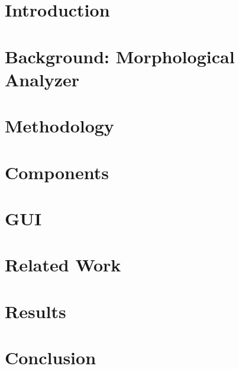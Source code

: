

\section{Introduction}
\label{sec:introduction}


\section{Background: Morphological Analyzer}
\label{sec:morph}


\vspace{-1em}
\section{\framework Methodology}
\vspace{-.5em}
\label{sec:methodology}


\vspace{-1em}
\section{\framework Components}
\label{sec:framework}
\label{sec:tool}


\section{\framework GUI}
\label{sec:gui}


\section{Related Work}
\label{sec:related}


\vspace{-1em}
\section{Results}
\label{sec:results}


\vspace{-1.5em}
\section{Conclusion}
\vspace{-1em}
\label{sec:conclusion}


\vspace{-1em}

{\tiny }

